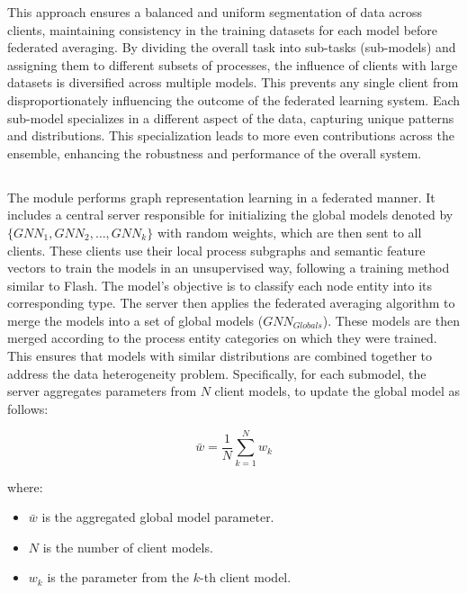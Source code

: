 This approach ensures a balanced and uniform segmentation of data across clients, maintaining consistency in the training datasets for each \gnnshort model before federated averaging. By dividing the overall task into sub-tasks (sub-models) and assigning them to different subsets of processes, the influence of clients with large datasets is diversified across multiple models. This prevents any single client from disproportionately influencing the outcome of the federated learning system. Each sub-model specializes in a different aspect of the data, capturing unique patterns and distributions. This specialization leads to more even contributions across the ensemble, enhancing the robustness and performance of the overall system.

\subsection{\fpgl}
\label{sys:fpgl}


The module performs graph representation learning in a federated manner. It includes a central server responsible for initializing the global \gnnshort models denoted by \(\{GNN_1, GNN_2, \ldots, GNN_k\} \) with random weights, which are then sent to all clients. These clients use their local process subgraphs and semantic feature vectors to train the \gnnshort models in an unsupervised way, following a training method similar to Flash. The \gnnshort model's objective is to classify each node entity into its corresponding type. The server then applies the federated averaging algorithm to merge the \gnnshort models into a set of global models (\( GNN_{Globals} \)). These models are then merged according to the process entity categories on which they were trained. This ensures that models with similar distributions are combined together to address the data heterogeneity problem. Specifically, for each submodel, the server aggregates parameters from \(N\) client models, to update the global model as follows:

\begin{equation}
\bar{w} = \frac{1}{N} \sum_{k=1}^{N}w_k
\end{equation}

where:
\begin{itemize}
    \item \(\bar{w}\) is the aggregated global model parameter.
    \item \(N\) is the number of client models.
    \item \(w_k\) is the parameter from the \(k\)-th client model.
\end{itemize}

